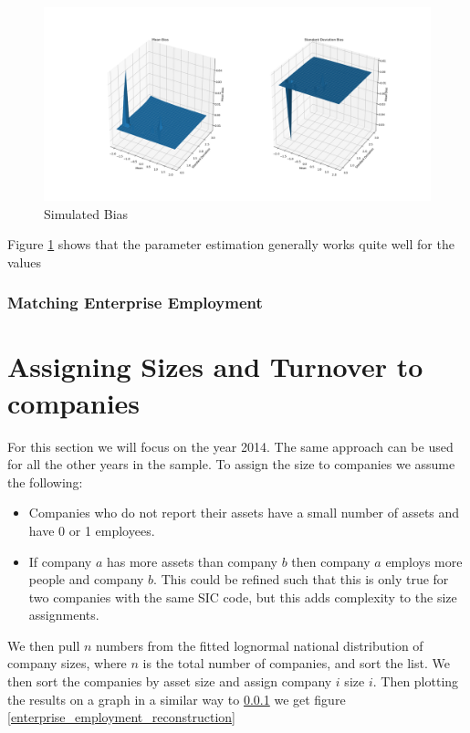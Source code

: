 \documentclass[a4paper,10pt]{article}
\begin{document}
   \begin{figure}[!ht]
      \begin{center}
         \caption{Simulated Bias}
         \label{bias}
         \includegraphics[width=\textwidth]{graphs/bias}
      \end{center}
   \end{figure}
   Figure \ref{bias} shows that the parameter estimation generally works quite well for the values 
   \subsubsection{Matching Enterprise Employment}
   \label{enterprise_employment}
   \section{Assigning Sizes and Turnover to companies}
   For this section we will focus on the year 2014. The same approach can be used for all the other years in the sample. To assign the size to companies we assume the following:
   \begin{itemize}
      \item Companies who do not report their assets have a small number of assets and have 0 or 1 employees.
      \item If company $a$ has more assets than company $b$ then company $a$ employs more people and company $b$. This could be refined such that this is only true for two companies with the same SIC code, but this adds complexity to the size assignments.
   \end{itemize}

   We then pull $n$ numbers from the fitted lognormal national distribution of company sizes, where $n$ is the total number of companies, and sort the list. We then sort the companies by asset size and assign company $i$ size $i$.
   Then plotting the results on a graph in a similar way to \ref{enterprise_employment} we get figure \ref{enterprise_employment_reconstruction}
\end{document}
